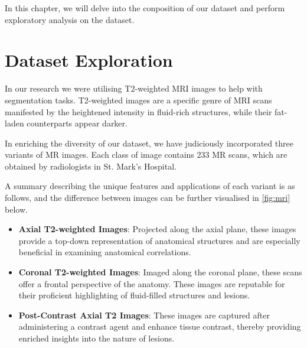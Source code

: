 In this chapter, we will delve into the conposition of our dataset and perform exploratory analysis on the dataset.

\section{Dataset Exploration}

In our research we were utilising T2-weighted MRI images to help with segmentation tasks. T2-weighted images are a specific genre of MRI scans manifested by the heightened intensity in fluid-rich structures, while their fat-laden counterparts appear darker.

In enriching the diversity of our dataset, we have judiciously incorporated three variants of MR images. Each class of image contains 233 MR scans, which are obtained by radiologists in St. Mark's Hospital.

A summary describing the unique features and applications of each variant is as follows, and the difference between images can be further visualised in \autoref{fig:mri} below.

\begin{itemize}
    \item \textbf{Axial T2-weighted Images}: Projected along the axial plane, these images provide a top-down representation of anatomical structures and are especially beneficial in examining anatomical correlations.
    \item \textbf{Coronal T2-weighted Images}: Imaged along the coronal plane, these scans offer a frontal perspective of the anatomy. These images are reputable for their proficient highlighting of fluid-filled structures and lesions.
    \item \textbf{Post-Contrast Axial T2 Images}: These images are captured after administering a contrast agent and enhance tissue contrast, thereby providing enriched insights into the nature of lesions.
\end{itemize}

